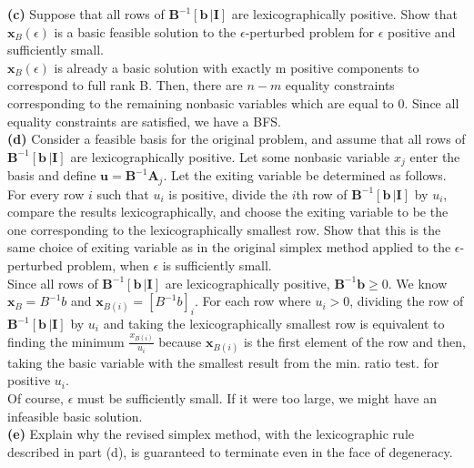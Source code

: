 \documentclass{article}
\begin{document}
\noindent
\textbf{(c)}  Suppose that all rows of $\mathbf{B}^{-1} [\mathbf{b} \, | \mathbf{I}]$ are lexicographically positive.  Show that $\mathbf{x}_B (\epsilon)$ is a basic feasible solution to the $\epsilon$-perturbed problem for $\epsilon$ positive and sufficiently small.\\


\noindent
$\mathbf{x}_B (\epsilon)$ is already a basic solution with exactly m positive components to correspond to full rank B.  Then, there are $n-m$ equality constraints corresponding to the remaining nonbasic variables which are equal to 0.  Since all equality constraints are satisfied, we have a BFS.  \\

\noindent
\textbf{(d)} Consider a feasible basis for the original problem, and assume that all rows of $\mathbf{B}^{-1} [\mathbf{b} \, | \mathbf{I}]$ are lexicographically positive.  Let some nonbasic variable $x_j$ enter the basis and define $\mathbf{u} = \mathbf{B}^{-1}\mathbf{A}_j$.  Let the exiting variable be determined as follows.  For every row $i$ such that $u_i$ is positive, divide the $i$th row of $\mathbf{B}^{-1} [\mathbf{b} \, | \mathbf{I}]$ by $u_i$, compare the results lexicographically, and choose the exiting variable to be the one corresponding to the lexicographically smallest row.  Show that this is the same choice of exiting variable as in the original simplex method applied to the $\epsilon$-perturbed problem, when $\epsilon$ is sufficiently small. \\


\noindent
Since all rows of $\mathbf{B}^{-1} [\mathbf{b} \, | \mathbf{I}]$ are lexicographically positive, $\mathbf{B}^{-1} \mathbf{b} \geq 0$.  We know $\mathbf{x}_B = B^{-1}b$ and $\mathbf{x}_{B(i)} = [B^{-1}b]_i$.  For each row where $u_i > 0$, dividing the row of $\mathbf{B}^{-1} [\mathbf{b} \, | \mathbf{I}]$ by $u_i$ and taking the lexicographically smallest row is equivalent to finding the minimum $\frac{x_{B(i)}}{u_i}$ because $\mathbf{x}_{B(i)}$ is the first element of the row and then, taking the basic variable with the smallest result from the min. ratio test. for positive $u_i$.\\

\noindent Of course, $\epsilon$ must be sufficiently small.  If it were too large, we might have an infeasible basic solution.\\

\noindent
\textbf{(e)}  Explain why the revised simplex method, with the lexicographic rule described in part (d), is guaranteed to terminate even in the face of degeneracy.  \\
\end{document}
